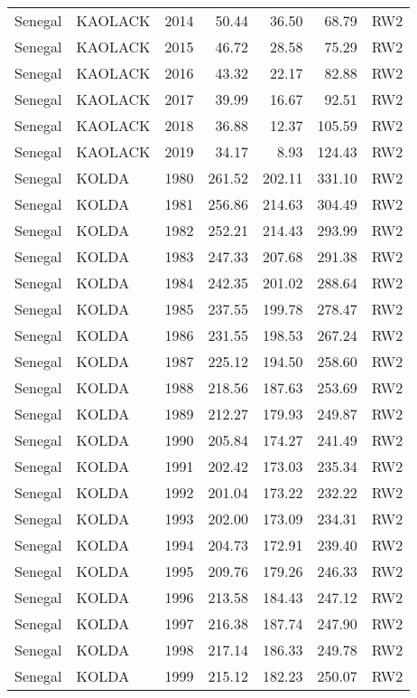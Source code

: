 \begin{longtable}{lllrrrl}
  Senegal & KAOLACK & 2014 & 50.44 & 36.50 & 68.79 & RW2 \\ 
  Senegal & KAOLACK & 2015 & 46.72 & 28.58 & 75.29 & RW2 \\ 
  Senegal & KAOLACK & 2016 & 43.32 & 22.17 & 82.88 & RW2 \\ 
  Senegal & KAOLACK & 2017 & 39.99 & 16.67 & 92.51 & RW2 \\ 
  Senegal & KAOLACK & 2018 & 36.88 & 12.37 & 105.59 & RW2 \\ 
  Senegal & KAOLACK & 2019 & 34.17 & 8.93 & 124.43 & RW2 \\ 
  Senegal & KOLDA & 1980 & 261.52 & 202.11 & 331.10 & RW2 \\ 
  Senegal & KOLDA & 1981 & 256.86 & 214.63 & 304.49 & RW2 \\ 
  Senegal & KOLDA & 1982 & 252.21 & 214.43 & 293.99 & RW2 \\ 
  Senegal & KOLDA & 1983 & 247.33 & 207.68 & 291.38 & RW2 \\ 
  Senegal & KOLDA & 1984 & 242.35 & 201.02 & 288.64 & RW2 \\ 
  Senegal & KOLDA & 1985 & 237.55 & 199.78 & 278.47 & RW2 \\ 
  Senegal & KOLDA & 1986 & 231.55 & 198.53 & 267.24 & RW2 \\ 
  Senegal & KOLDA & 1987 & 225.12 & 194.50 & 258.60 & RW2 \\ 
  Senegal & KOLDA & 1988 & 218.56 & 187.63 & 253.69 & RW2 \\ 
  Senegal & KOLDA & 1989 & 212.27 & 179.93 & 249.87 & RW2 \\ 
  Senegal & KOLDA & 1990 & 205.84 & 174.27 & 241.49 & RW2 \\ 
  Senegal & KOLDA & 1991 & 202.42 & 173.03 & 235.34 & RW2 \\ 
  Senegal & KOLDA & 1992 & 201.04 & 173.22 & 232.22 & RW2 \\ 
  Senegal & KOLDA & 1993 & 202.00 & 173.09 & 234.31 & RW2 \\ 
  Senegal & KOLDA & 1994 & 204.73 & 172.91 & 239.40 & RW2 \\ 
  Senegal & KOLDA & 1995 & 209.76 & 179.26 & 246.33 & RW2 \\ 
  Senegal & KOLDA & 1996 & 213.58 & 184.43 & 247.12 & RW2 \\ 
  Senegal & KOLDA & 1997 & 216.38 & 187.74 & 247.90 & RW2 \\ 
  Senegal & KOLDA & 1998 & 217.14 & 186.33 & 249.78 & RW2 \\ 
  Senegal & KOLDA & 1999 & 215.12 & 182.23 & 250.07 & RW2 \\ 

\end{longtable}
